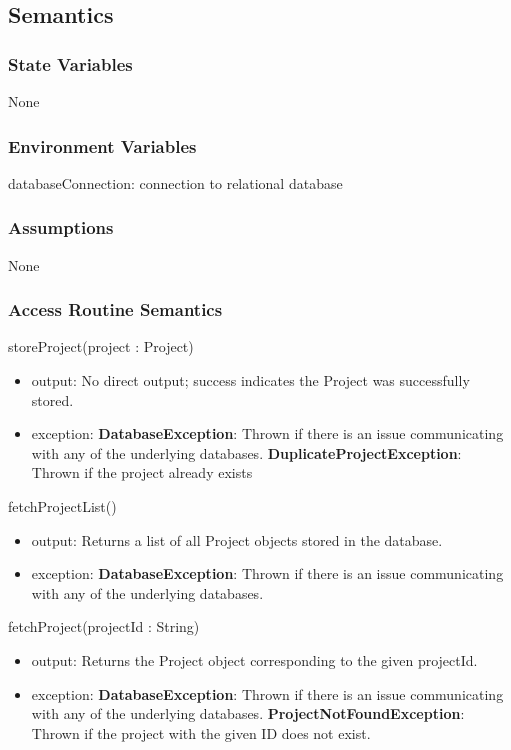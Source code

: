 \documentclass[12pt, titlepage]{article}
\begin{document}
    \subsection{Semantics}
    \subsubsection{State Variables}
        None

    \subsubsection{Environment Variables}
        databaseConnection: connection to relational database

    \subsubsection{Assumptions}
        None

    \subsubsection{Access Routine Semantics}
        \noindent storeProject(project : Project)
        \begin{itemize}
            \item output: No direct output; success indicates the Project was successfully stored.
            \item exception: \textbf{DatabaseException}: Thrown if there is an issue communicating with any of the underlying databases. \textbf{DuplicateProjectException}: Thrown if the project already exists
        \end{itemize}
        \noindent fetchProjectList()
        \begin{itemize}
            \item output: Returns a list of all Project objects stored in the database.
            \item exception: \textbf{DatabaseException}: Thrown if there is an issue communicating with any of the underlying databases. 
        \end{itemize}
        \noindent fetchProject(projectId : String)
        \begin{itemize}
            \item output: Returns the Project object corresponding to the given projectId.
            \item exception: \textbf{DatabaseException}: Thrown if there is an issue communicating with any of the underlying databases. \textbf{ProjectNotFoundException}: Thrown if the project with the given ID does not exist.
        \end{itemize}
\end{document}
